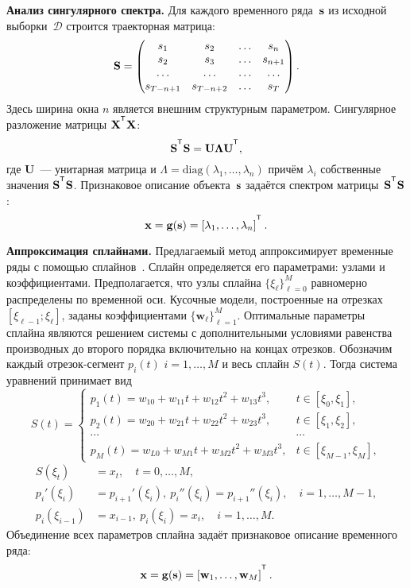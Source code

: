 \documentclass[11pt, a5paper]{dissert}
\begin{document}
\textbf{Анализ сингулярного спектра.}
Для каждого временного ряда~$\mathbf{s}$ из исходной выборки~$\mathcal{D}$ строится траекторная матрица:
\[
	\mathbf{S} = 
	\begin{pmatrix}
		s_1 & s_2 & \dots & s_n \\
		s_2 & s_3 & \dots & s_{n+1} \\
		\dots & \dots & \dots & \dots \\
		s_{T-n+1} & s_{T-n+2} & \dots & s_T
	\end{pmatrix}.
\]
Здесь ширина окна $n$ является внешним структурным параметром.
Сингулярное разложение матрицы $\mathbf{X}^{\T} \mathbf{X}$:
\[
	\bS^{\T} \bS = \mathbf{U} \mathbf{\Lambda} \mathbf{U}^{\T},
\]
где $\mathbf{U}$~--- унитарная матрица и $\Lambda = \mathrm{diag}(\lambda_1, \dots, \lambda_n)$ причём $\lambda_i$ собственные значения $\bS^{\T} \bS$. 
Признаковое описание объекта~$\mathbf{s}$ задаётся спектром матрицы~$\bS^{\T} \bS$:
\[
	\bx = \mathbf{g}(\bs) = \left[\lambda_1, \dots, \lambda_n\right]^{\T}.
\]

\textbf{Аппроксимация сплайнами.}
Предлагаемый метод аппроксимирует временные ряды с помощью сплайнов~\cite{deboor1978splines}. Сплайн определяется его параметрами: узлами и коэффициентами.
Предполагается, что узлы сплайна $\{\xi_\ell\}_{\ell=0}^M$ равномерно распределены по временной оси.
Кусочные модели, построенные на отрезках $[\xi_{\ell-1}; \xi_{\ell}]$, заданы коэффициентами $\{\mathbf{w}_\ell\}_{\ell=1}^{M}$.
Оптимальные параметры сплайна являются решением системы с дополнительными условиями равенства производных до второго порядка включительно на концах отрезков.
Обозначим каждый отрезок-сегмент $p_i(t)$ $i = 1, \dots, M$ и весь сплайн $S(t)$. Тогда система уравнений принимает вид
\begin{equation*}
	S(t) = \begin{cases}
		p_1(t) = w_{10} +w_{11}t + w_{12}t^2 + w_{13}t^3, & t\in [\xi_0, \xi_1],\\
		p_2(t) = w_{20} +w_{21}t + w_{22}t^2 + w_{23}t^3, & t\in [\xi_1, \xi_2],\\
		\cdots&\cdots \\
		p_{M}(t) = w_{L0} +w_{M1}t + w_{M2}t^2 + w_{M3}t^3, & t\in [\xi_{M-1}, \xi_M],					
	\end{cases}
\end{equation*}
\begin{align*}
	S(\xi_t) &= x_t, \quad t = 0, \dots, M,\\
	p_i'(\xi_i) &= p_{i+1}'(\xi_i),\: p_i''(\xi_i) = p_{i+1}''(\xi_i), \quad i = 1, \dots, M-1,\\
	p_i(\xi_{i-1}) &= x_{i-1},\: p_i(\xi_i) = x_i, \quad i = 1, \dots, M.
\end{align*}
Объединение всех параметров сплайна задаёт признаковое описание временного ряда:
\[
	\bx = \mathbf{g}(\bs) = \left[\mathbf{w}_1, \dots, \mathbf{w}_{M}\right]^{\T}.
\]
\end{document}
